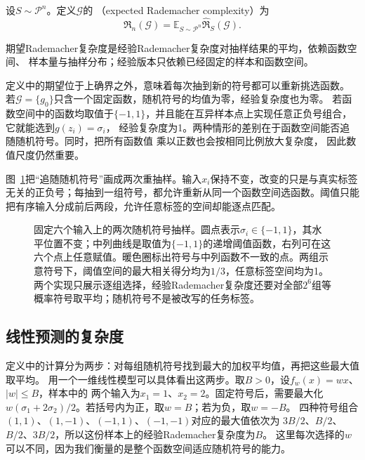 \begin{definition}[期望Rademacher复杂度]
\label{def:expected-rademacher-complexity}
设$S\sim\mathcal P^n$。定义$\mathcal G$的
（expected Rademacher complexity）为
\[
 \mathfrak R_n(\mathcal G)=\mathbb E_{S\sim\mathcal P^n}
       \widehat{\mathfrak R}_S(\mathcal G).
\]
\end{definition}

期望Rademacher复杂度是经验Rademacher复杂度对抽样结果的平均，依赖函数空间、
样本量与抽样分布；经验版本只依赖已经固定的样本和函数空间。

定义中的期望位于上确界之外，意味着每次抽到新的符号都可以重新挑选函数。
若$\mathcal G=\{g_0\}$只含一个固定函数，随机符号的均值为零，经验复杂度也为零。
若函数空间中的函数均取值于$\{-1,1\}$，并且能在互异样本点上实现任意正负号组合，
它就能选到$g(z_i)=\sigma_i$，
经验复杂度为1。两种情形的差别在于函数空间能否追随随机符号。同时，把所有函数值
乘以正数也会按相同比例放大复杂度，
因此数值尺度仍然重要。

图~\ref{fig:learning-rademacher-flips}把“追随随机符号”画成两次重抽样。输入$x_i$保持不变，改变的只是与真实标签无关的正负号；每抽到一组符号，都允许重新从同一个函数空间选函数。阈值只能把有序输入分成前后两段，允许任意标签的空间却能逐点匹配。

\begin{figure}[htbp]
 \centering
 
 \caption{固定六个输入上的两次随机符号抽样。圆点表示$\sigma_i\in\{-1,1\}$，其水平位置不变；中列曲线是取值为$\{-1,1\}$的递增阈值函数，右列可在这六个点上任意赋值。暖色圈标出符号与中列函数不一致的点。两组示意符号下，阈值空间的最大相关得分均为$1/3$，任意标签空间均为1。两个实现只展示逐组选择，经验Rademacher复杂度还要对全部$2^6$组等概率符号取平均；随机符号不是被改写的任务标签。}
 \label{fig:learning-rademacher-flips}
\end{figure}

\subsection{线性预测的复杂度}

定义中的计算分为两步：对每组随机符号找到最大的加权平均值，再把这些最大值取平均。
用一个一维线性模型可以具体看出这两步。取$B>0$，设$f_w(x)=wx$、$|w|\leq B$，样本中的
两个输入为$x_1=1$、$x_2=2$。固定符号后，需要最大化
$w(\sigma_1+2\sigma_2)/2$。若括号内为正，取$w=B$；若为负，取$w=-B$。
四种符号组合$(1,1)$、$(1,-1)$、$(-1,1)$、$(-1,-1)$对应的最大值依次为
$3B/2$、$B/2$、$B/2$、$3B/2$，所以这份样本上的经验Rademacher复杂度为$B$。
这里每次选择的$w$可以不同，因为我们衡量的是整个函数空间适应随机符号的能力。

